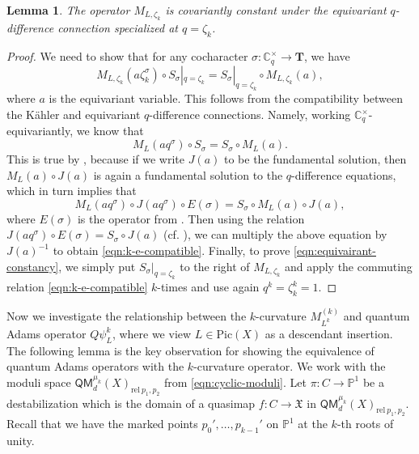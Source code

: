 \documentclass[reqno]{amsart}
\numberwithin{equation}{section}
\numberwithin{equation}{section}
\numberwithin{equation}{section}
\newtheorem{lemma}[thm]{Lemma}
\theoremstyle{definition}
\theoremstyle{remark}
\theoremstyle{remark}
\begin{document}
\begin{lemma}\label{lem:p-curvarture-shift}
    The operator $M_{L, \zeta_k}$ is covariantly constant under the equivariant $q$-difference connection specialized at $q = \zeta_k$.
\end{lemma}
\begin{proof}
    We need to show that for any cocharacter $\sigma: \mathbb{C}^{\times}_q \to \mathbf{T}$, we have
    \begin{equation}\label{eqn:equivairant-constancy}
        M_{L, \zeta_k}(a \zeta_k^{\sigma}) \circ S_{\sigma}|_{q=\zeta_k} = S_{\sigma}|_{q=\zeta_k} \circ M_{L, \zeta_k}(a),
    \end{equation}
    where $a$ is the equivariant variable. This follows from the compatibility between the K\"ahler and equivariant $q$-difference connections. Namely, working $\mathbb{C}_{q}^{\times}$-equivariantly, we know that
    \begin{equation}\label{eqn:k-e-compatible}
        M_L(aq^{\sigma}) \circ S_{\sigma} = S_{\sigma} \circ M_L(a).
    \end{equation}
    This is true by \cite[Section 8]{Oko17}, because if we write $J(a)$ to be the fundamental solution, then $M_L(a) \circ J(a)$ is again a fundamental solution to the $q$-difference equations, which in turn implies that 
    \begin{equation}
        M_L(aq^{\sigma}) \circ J(aq^{\sigma}) \circ E(\sigma) = S_{\sigma} \circ M_L(a) \circ J(a),
    \end{equation}
    where $E(\sigma)$ is the operator from \cite[Equation (8.2.13)]{Oko17}. Then using the relation $J(aq^{\sigma}) \circ E(\sigma) = S_{\sigma} \circ J(a)$ (cf. \cite[Theorem 8.2.20]{Oko17}), we can multiply the above equation by $J(a)^{-1}$ to obtain \eqref{eqn:k-e-compatible}. Finally, to prove \eqref{eqn:equivairant-constancy}, we simply put $S_{\sigma}|_{q=\zeta_k}$ to the right of $M_{L, \zeta_k}$ and apply the commuting relation \eqref{eqn:k-e-compatible} $k$-times and use again $q^k = \zeta_k^k = 1$.
\end{proof}

Now we investigate the relationship between the $k$-curvature $M_{L^k}^{(k)}$ and quantum Adams operator $Q\psi^k_{L}$, where we view $L \in \mathrm{Pic}(X)$ as a descendant insertion. The following lemma is the key observation for showing the equivalence of quantum Adams operators with the $k$-curvature operator. We work with the moduli space $\mathsf{QM}_d^{\mu_k}(X)_{\mathrm{rel} \  p_1, p_2}$ from \eqref{eqn:cyclic-moduli}. Let $\pi: C \to \mathbb{P}^1$ be a destabilization which is the domain of a quasimap $f: C \to \mathfrak{X}$ in $\mathsf{QM}_d^{\mu_k}(X)_{\mathrm{rel} \  p_1, p_2}$. Recall that we have the marked points $p_0', \dots, p_{k-1}'$ on $\mathbb{P}^1$ at the $k$-th roots of unity.
\end{document}
